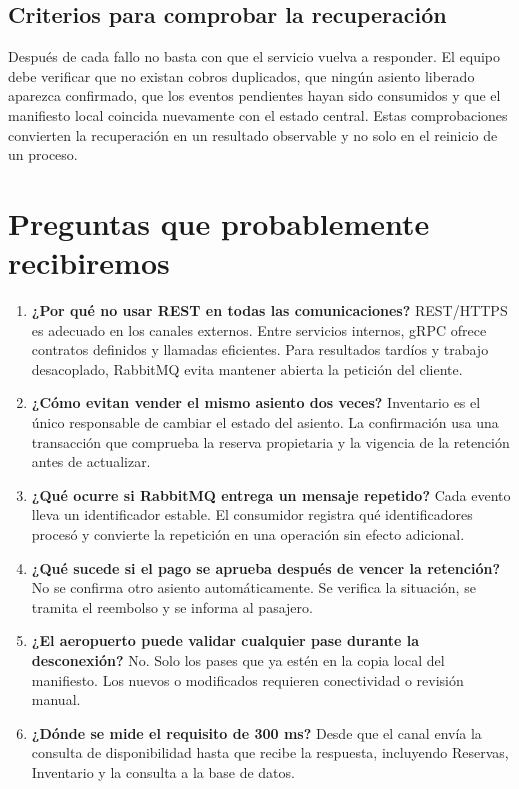\documentclass[11pt,a4paper]{article}
\begin{document}
\subsection*{Criterios para comprobar la recuperación}

Después de cada fallo no basta con que el servicio vuelva a responder. El equipo debe verificar que no existan cobros duplicados, que ningún asiento liberado aparezca confirmado, que los eventos pendientes hayan sido consumidos y que el manifiesto local coincida nuevamente con el estado central. Estas comprobaciones convierten la recuperación en un resultado observable y no solo en el reinicio de un proceso.

\section*{Preguntas que probablemente recibiremos}

\begin{enumerate}[leftmargin=*,itemsep=5pt]
  \item \textbf{¿Por qué no usar REST en todas las comunicaciones?} REST/HTTPS es adecuado en los canales externos. Entre servicios internos, gRPC ofrece contratos definidos y llamadas eficientes. Para resultados tardíos y trabajo desacoplado, RabbitMQ evita mantener abierta la petición del cliente.
  \item \textbf{¿Cómo evitan vender el mismo asiento dos veces?} Inventario es el único responsable de cambiar el estado del asiento. La confirmación usa una transacción que comprueba la reserva propietaria y la vigencia de la retención antes de actualizar.
  \item \textbf{¿Qué ocurre si RabbitMQ entrega un mensaje repetido?} Cada evento lleva un identificador estable. El consumidor registra qué identificadores procesó y convierte la repetición en una operación sin efecto adicional.
  \item \textbf{¿Qué sucede si el pago se aprueba después de vencer la retención?} No se confirma otro asiento automáticamente. Se verifica la situación, se tramita el reembolso y se informa al pasajero.
  \item \textbf{¿El aeropuerto puede validar cualquier pase durante la desconexión?} No. Solo los pases que ya estén en la copia local del manifiesto. Los nuevos o modificados requieren conectividad o revisión manual.
  \item \textbf{¿Dónde se mide el requisito de 300 ms?} Desde que el canal envía la consulta de disponibilidad hasta que recibe la respuesta, incluyendo Reservas, Inventario y la consulta a la base de datos.
\end{enumerate}
\end{document}
